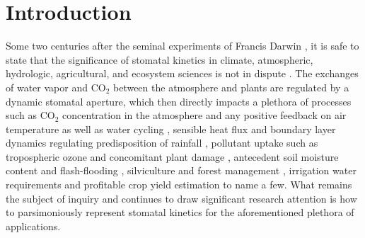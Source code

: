 \documentclass[utf8]{frontiersSCNS} %
\begin{document}
\section{Introduction}
Some two centuries after the seminal experiments of Francis Darwin \citep{darwin1898ix,scarth1927stomatal}, it is safe to state that the significance of stomatal kinetics in climate, atmospheric, hydrologic, agricultural, and ecosystem sciences is not in dispute \citep{hetherington2003role}.  The exchanges of water vapor and CO$_2$ between the atmosphere and plants are regulated by a dynamic stomatal aperture, which then directly impacts a plethora of processes such as CO$_2$ concentration in the atmosphere and any positive feedback on air temperature \citep{cox2000acceleration} as well as water cycling \citep{betts2007projected,katul2012evapotranspiration}, sensible heat flux and boundary layer dynamics regulating predisposition of rainfall \citep{siqueira2009soil, manoli2016soil}, pollutant uptake such as tropospheric ozone and concomitant plant damage \citep{rich1964ozone,musselman2006critical}, antecedent soil moisture content and flash-flooding \citep{javelle2010flash}, silviculture and forest management \citep{makela1986stand}, irrigation water requirements and profitable crop yield estimation \citep{vico2015ecohydrology} to name a few.  What remains the subject of inquiry and continues to draw significant research attention is how to parsimoniously represent stomatal kinetics for the aforementioned plethora of applications. 
\end{document}
